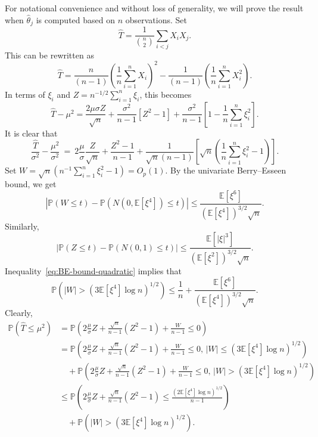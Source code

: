 \documentclass{article}
\numberwithin{myalgctr}{section}
\begin{document}
For notational convenience and without loss of generality, we will prove the result when $\widehat{\theta}_j$ is computed based on $n$ observations. Set
\[
\widehat{T} = \frac{1}{\binom{n}{2}} \sum_{i < j} X_i X_j. 
\]
This can be rewritten as
\[
\widehat{T} = \frac{n}{(n-1)} \left( \frac{1}{n} \sum_{i=1}^n X_i \right)^2 - \frac{1}{(n-1)} \left( \frac{1}{n} \sum_{i=1}^n X_i^2  \right).
\]
In terms of $\xi_i$ and $Z = n^{-1/2}\sum_{i=1}^n \xi_i$, this becomes
\[
\widehat{T} - \mu^2 = \frac{2 \mu \sigma Z}{\sqrt{n}} + \frac{\sigma^2}{n-1} \left[ Z^2 - 1 \right] + \frac{\sigma^2}{n-1}\left[ 1 - \frac{1}{n} \sum_{i=1}^n \xi_i^2\right].
\]
It is clear that
\[
\frac{\widehat{T}}{\sigma^2} - \frac{\mu^2}{\sigma^2} ~=~ 2\frac{\mu}{\sigma}\frac{Z}{\sqrt{n}} + \frac{Z^2 - 1}{n-1} + \frac{1}{\sqrt{n}(n-1)}\left[\sqrt{n}\left(\frac{1}{n}\sum_{i=1}^n {\xi_i^2} - 1\right)\right].
\]
Set $W = \sqrt{n}(n^{-1}\sum_{i=1}^n \xi_i^2 - 1) = O_p(1)$. By the univariate Berry--Esseen bound, we get
\begin{equation}\label{eq:BE-bound-quadratic}
\left|\mathbb{P}\left(W \le t\right) - \mathbb{P}\left(N(0, \mathbb{E}[\xi^4]) \le t\right)\right| \le \frac{\mathbb{E}[\xi^6]}{(\mathbb{E}[\xi^4])^{3/2}\sqrt{n}}.
\end{equation}
Similarly,
\begin{equation}\label{eq:BE-bound-Z}
\left|\mathbb{P}(Z \le t) - \mathbb{P}(N(0, 1) \le t)\right| \le \frac{\mathbb{E}[|\xi|^3]}{(\mathbb{E}[\xi^2])^{3/2}\sqrt{n}}.
\end{equation}
Inequality~\eqref{eq:BE-bound-quadratic} implies that 
\[
\mathbb{P}\left(|W| > (3\mathbb{E}[\xi^4]\log n)^{1/2}\right) \le \frac{1}{n} + \frac{\mathbb{E}[\xi^6]}{(\mathbb{E}[\xi^4])^{3/2}\sqrt{n}}.
\]
Clearly, 
\begin{equation}\label{eq:less-median-bias}
\begin{split}
\mathbb{P}\left(\widehat{T} \le \mu^2\right) &= \mathbb{P}\left(2\frac{\mu}{\sigma} Z + \frac{\sqrt{n}}{n-1}(Z^2 - 1) + \frac{W}{n-1} \le 0\right)\\
&= \mathbb{P}\left(2\frac{\mu}{\sigma} Z + \frac{\sqrt{n}}{n-1}(Z^2 - 1) + \frac{W}{n-1} \le 0,\, |W| \le (3\mathbb{E}[\xi^4]\log n)^{1/2}\right)\\
&\quad+ \mathbb{P}\left(2\frac{\mu}{\sigma} Z + \frac{\sqrt{n}}{n-1}(Z^2 - 1) + \frac{W}{n-1} \le 0,\, |W| > (3\mathbb{E}[\xi^4]\log n)^{1/2}\right)\\
&\le \mathbb{P}\left(2\frac{\mu}{\sigma} Z + \frac{\sqrt{n}}{n-1}(Z^2 - 1) \le \frac{(2\mathbb{E}[\xi^4]\log n)^{1/2}}{n-1}\right)\\ 
&\quad+ \mathbb{P}(|W| > (3\mathbb{E}[\xi^4]\log n)^{1/2}).
\end{split}
\end{equation}
\end{document}
